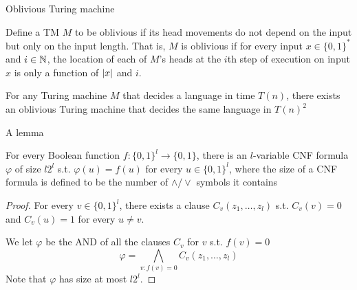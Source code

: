 \documentclass[presentation]{beamer}
\begin{document}
\begin{frame}[label={sec:org7595a6b}]{Oblivious Turing machine}
\begin{definition}[]
Define a TM \(M\) to be \alert{oblivious} if its head movements do not depend on the input but only on
the input length. That is, \(M\) is oblivious if for every input \(x\in\{0,1\}^*\) and \(i\in\mathbb{N}\), the
location of each of \(M\)'s heads at the \(i\)th step of execution on input \(x\) is only a
function of \(\abs{x}\) and \(i\).
\end{definition}

\begin{theorem}[]
For any Turing machine \(M\) that decides a language in time \(T(n)\), there exists an oblivious
Turing machine that decides the same language in \(T(n)^2\)
\end{theorem}
\end{frame}
\begin{frame}[label={sec:org57495ff}]{A lemma}
\begin{lemma}[]
For every Boolean function \(f:\{0,1\}^l\to\{0,1\}\), there is an \(l\)-variable CNF formula \(\varphi\)
of size \(l2^l\) s.t. \(\varphi(u)=f(u)\) for every \(u\in\{0,1\}^l\), where the size of a CNF
formula is defined to be the number of \(\wedge/\vee\) symbols it contains
\end{lemma}

\begin{proof}
For every \(v\in\{0,1\}^l\), there exists a clause \(C_v(z_1,\dots,z_l)\) s.t. \(C_v(v)=0\)
and \(C_v(u)=1\) for every \(u\neq v\).

We let \(\varphi\) be the AND of all the clauses \(C_v\) for \(v\) s.t. \(f(v)=0\)
     \begin{equation*}
\varphi=\bigwedge_{v:f(v)=0}C_v(z_1,\dots,z_l)
     \end{equation*}
Note that \(\varphi\) has size at most \(l2^l\).
\end{proof}
\end{frame}
\end{document}
